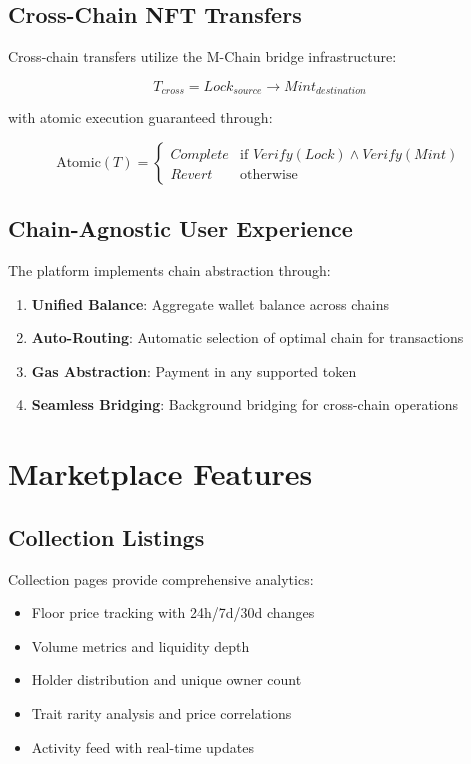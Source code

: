 \documentclass[11pt,a4paper]{article}
\begin{document}
\subsection{Cross-Chain NFT Transfers}

Cross-chain transfers utilize the M-Chain bridge infrastructure:

\begin{equation}
T_{cross} = Lock_{source} \rightarrow Mint_{destination}
\end{equation}

with atomic execution guaranteed through:

\begin{equation}
\text{Atomic}(T) = \begin{cases}
Complete & \text{if } Verify(Lock) \land Verify(Mint) \\
Revert & \text{otherwise}
\end{cases}
\end{equation}

\subsection{Chain-Agnostic User Experience}

The platform implements chain abstraction through:

\begin{enumerate}
\item \textbf{Unified Balance}: Aggregate wallet balance across chains
\item \textbf{Auto-Routing}: Automatic selection of optimal chain for transactions
\item \textbf{Gas Abstraction}: Payment in any supported token
\item \textbf{Seamless Bridging}: Background bridging for cross-chain operations
\end{enumerate}

\section{Marketplace Features}

\subsection{Collection Listings}

Collection pages provide comprehensive analytics:

\begin{itemize}
\item Floor price tracking with 24h/7d/30d changes
\item Volume metrics and liquidity depth
\item Holder distribution and unique owner count
\item Trait rarity analysis and price correlations
\item Activity feed with real-time updates
\end{itemize}
\end{document}
